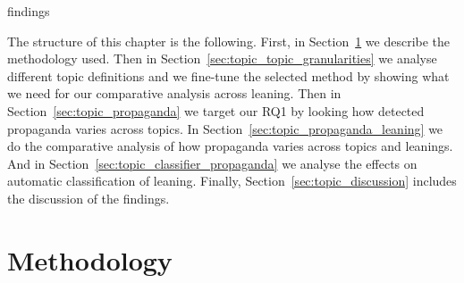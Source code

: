 



findings

The structure of this chapter is the following. First, in Section~\ref{sec:topic_method} we describe the methodology used. Then in Section~\ref{sec:topic_topic_granularities} we analyse different topic definitions and we fine-tune the selected method by showing what we need for our comparative analysis across leaning. Then in Section~\ref{sec:topic_propaganda} we target our RQ1 by looking how detected propaganda varies across topics. In Section~\ref{sec:topic_propaganda_leaning} we do the comparative analysis of how propaganda varies across topics and leanings. And in Section~\ref{sec:topic_classifier_propaganda} we analyse the effects on automatic classification of leaning.
Finally, Section~\ref{sec:topic_discussion} includes the discussion of the findings.







\section{\statusgreen Methodology}
\label{sec:topic_method}

